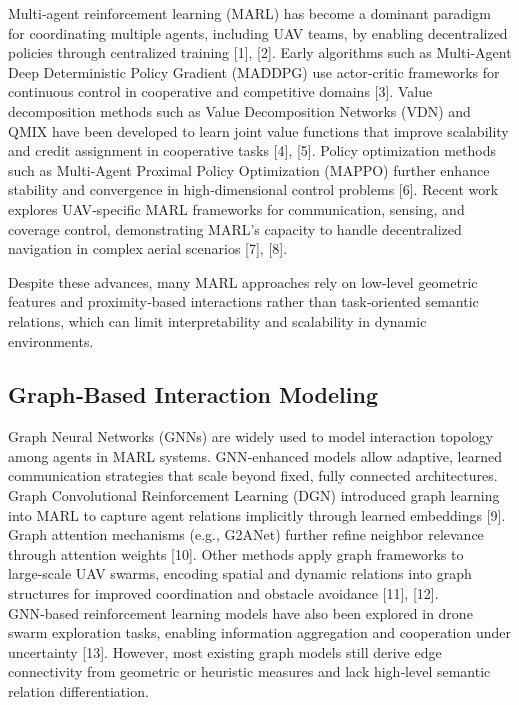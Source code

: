 \documentclass[conference]{IEEEtran}
\begin{document}
Multi‑agent reinforcement learning (MARL) has become a dominant paradigm for coordinating multiple agents, including UAV teams, by enabling decentralized policies through centralized training [1], [2]. Early algorithms such as Multi‑Agent Deep Deterministic Policy Gradient (MADDPG) use actor‑critic frameworks for continuous control in cooperative and competitive domains [3]. Value decomposition methods such as Value Decomposition Networks (VDN) and QMIX have been developed to learn joint value functions that improve scalability and credit assignment in cooperative tasks [4], [5]. Policy optimization methods such as Multi‑Agent Proximal Policy Optimization (MAPPO) further enhance stability and convergence in high‑dimensional control problems [6]. Recent work explores UAV‑specific MARL frameworks for communication, sensing, and coverage control, demonstrating MARL’s capacity to handle decentralized navigation in complex aerial scenarios [7], [8].

Despite these advances, many MARL approaches rely on low‑level geometric features and proximity‑based interactions rather than task‑oriented semantic relations, which can limit interpretability and scalability in dynamic environments.

\subsection{Graph‑Based Interaction Modeling}
Graph Neural Networks (GNNs) are widely used to model interaction topology among agents in MARL systems. GNN‑enhanced models allow adaptive, learned communication strategies that scale beyond fixed, fully connected architectures. Graph Convolutional Reinforcement Learning (DGN) introduced graph learning into MARL to capture agent relations implicitly through learned embeddings [9]. Graph attention mechanisms (e.g., G2ANet) further refine neighbor relevance through attention weights [10]. Other methods apply graph frameworks to large‑scale UAV swarms, encoding spatial and dynamic relations into graph structures for improved coordination and obstacle avoidance [11], [12]. GNN‑based reinforcement learning models have also been explored in drone swarm exploration tasks, enabling information aggregation and cooperation under uncertainty [13]. However, most existing graph models still derive edge connectivity from geometric or heuristic measures and lack high‑level semantic relation differentiation.
\end{document}
